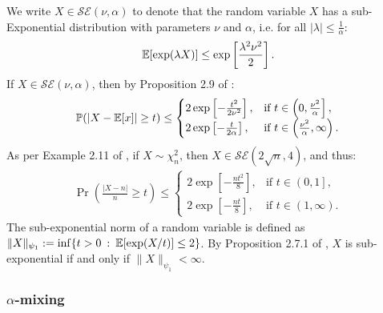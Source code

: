 We write $X\in\mathcal{SE}(\nu, \alpha)$ to denote that the random variable $X$ has a sub-Exponential distribution with parameters $\nu$ and $\alpha$, i.e. for all $|\lambda| \leq \frac{1}{\alpha}$: 
\begin{align*}
    \mathbb{E}[\exp(\lambda X)] \leq \exp\left[\frac{\lambda^2\nu^2}{2}\right].
\end{align*}
If $X\in\mathcal{SE}(\nu, \alpha)$, then by Proposition 2.9 of \cite{Wainwright19}:
\begin{align}\label{eq:wainwright_prop_2.9}
    \mathbb{P}(|X - \mathbb{E}[x]| \geq t) \leq 
    \begin{cases}
        2 \exp\left[-\frac{t^2}{2\nu^2}\right], & \text{if } t \in \left(0, \frac{\nu^2}{\alpha}\right], \\
        2 \exp\left[-\frac{t}{2\alpha}\right], & \text{if } t \in \left(\frac{\nu^2}{\alpha}, \infty\right).
    \end{cases}
\end{align}
As per Example 2.11 of \cite{Wainwright19}, if $X \sim \chi^2_n$, then $X\in\mathcal{SE}(2\sqrt{n}, 4)$, and thus: 
\begin{align} \label{eq:chi2-ineq}
    \Pr\left(\frac{|X - n|}{n} \geq t\right) \leq 
    \begin{cases}
        2 \exp\left[-\frac{n t^2}{8}\right], & \text{if } t \in \left(0, 1\right], \\
        2 \exp\left[-\frac{n t}{8}\right], & \text{if } t \in \left(1, \infty\right).
    \end{cases}
\end{align}
The sub-exponential norm of a random variable is defined as $\lVert X \rVert_{\psi_1} := \inf\{t > 0 \::\: \mathbb{E}[\exp(X /t)] \leq 2\}$. By Proposition 2.7.1 of \cite{Vershynin18}, $X$ is sub-exponential if and only if $\lVert X \rVert_{\psi_1} < \infty$.

\subsubsection{$\alpha$-mixing}

